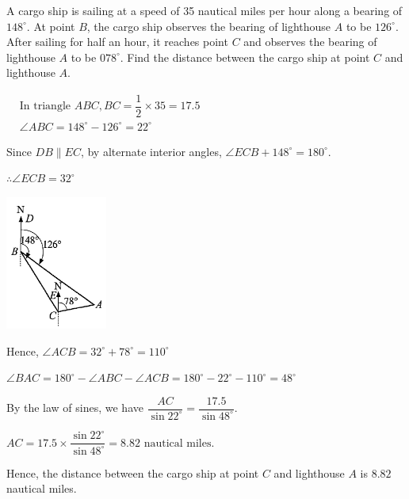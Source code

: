 \documentclass{report}
\begin{document}
   \begin{question}
    \begin{vwcol}[widths={0.7,0.3}, sep=8mm, rule=0pt]
        A cargo ship is sailing at a speed of 35 nautical miles per hour along a bearing of $148^\circ$. At point $B$, the cargo ship observes the bearing of lighthouse $A$ to be $126^\circ$. After sailing for half an hour, it reaches point $C$ and observes the bearing of lighthouse $A$ to be $078^\circ$. Find the distance between the cargo ship at point $C$ and lighthouse $A$.

        \vspace{2em}    
        \sol{}
        \vspace{1em}
        
        \noindent $
        \begin{aligned}
        & \text{In triangle } ABC, BC = \dfrac{1}{2} \times 35 = 17.5 \\
        & \angle ABC = 148^\circ - 126^\circ = 22^\circ
        \end{aligned}
        $
        
        \vspace{1em}
        \noindent Since $DB \parallel EC$, by alternate interior angles, $\angle ECB + 148^\circ = 180^\circ$.
        
        \vspace{0.8em}
        \noindent $\therefore \angle ECB = 32^\circ$

        \vspace{4em}

        \includegraphics[width=0.25\textwidth]{assets/10-66.jpg}
    \end{vwcol}
    \vspace{-2.3em}
    \noindent Hence, $\angle A C B=32^{\circ}+78^{\circ}=110^{\circ}$

    \vspace{-0.5em}
    \noindent $
    \angle B A C=180^{\circ}-\angle A B C-\angle A C B=180^{\circ}-22^{\circ}-110^{\circ}=48^{\circ}
    $

    \vspace{-0.5em}
    \noindent By the law of sines, we have $\dfrac{AC}{\sin 22^\circ} = \dfrac{17.5}{\sin 48^\circ}$.
    
    \vspace{-0.5em}
    \noindent $
    AC = 17.5 \times \dfrac{\sin 22^\circ}{\sin 48^\circ} = 8.82 \text{ nautical miles}.
    $
    
    \vspace{-0.5em}
    \noindent Hence, the distance between the cargo ship at point $C$ and lighthouse $A$ is $8.82$ nautical miles.
   \end{question}
\end{document}
